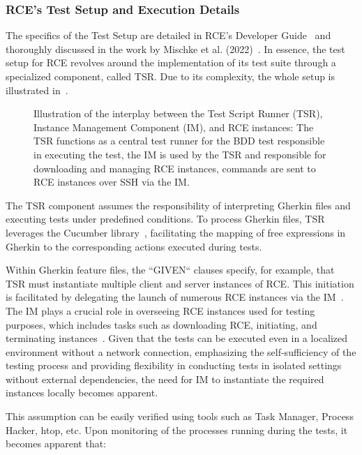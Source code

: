 \subsubsection{\ac{RCE}'s Test Setup and Execution Details}
The specifics of the Test Setup are detailed in \ac{RCE}'s Developer Guide~\cite{rceDevGuide10x} and thoroughly discussed in the work by Mischke et al. (2022)~\cite{10.1007/978-3-031-08760-8_44}. In essence, the test setup for \ac{RCE} revolves around the implementation of its test suite through a specialized component, called \acf{TSR}.
Due to its complexity, the whole setup is illustrated in~.

\begin{figure}[h]
    \centering
    
    \caption{Illustration of the interplay between the Test Script Runner (TSR), Instance Management Component (IM), and RCE instances: The TSR functions as a central test runner for the BDD test responsible in executing the test, the IM is used by the TSR and responsible for downloading and managing RCE instances, commands are sent to RCE instances over SSH via the IM.}
    \label{fig:rce-setup}
\end{figure}

The \ac{TSR} component assumes the responsibility of interpreting Gherkin files and executing tests under predefined conditions. To process Gherkin files, \ac{TSR} leverages the Cucumber library~\cite{10.1007/978-3-031-08760-8_44}, facilitating the mapping of free expressions in Gherkin to the corresponding actions executed during tests.

Within Gherkin feature files, the ``GIVEN`` clauses specify, for example, that \ac{TSR} must instantiate multiple client and server instances of \ac{RCE}. This initiation is facilitated by delegating the launch of numerous \ac{RCE} instances via the \acf{IM}~\cite{rceDevGuide10x}. 
The \ac{IM} plays a crucial role in overseeing \ac{RCE} instances used for testing purposes, which includes tasks such as downloading \ac{RCE}, initiating, and terminating instances~\cite{10.1007/978-3-031-08760-8_44,rceDevGuide10x}. Given that the tests can be executed even in a localized environment without a network connection, emphasizing the self-sufficiency of the testing process and providing flexibility in conducting tests in isolated settings without external dependencies, the need for \ac{IM} to instantiate the required instances locally becomes apparent.

This assumption can be easily verified using tools such as Task Manager, Process Hacker, htop, etc. Upon monitoring of the processes running during the tests, it becomes apparent that:

